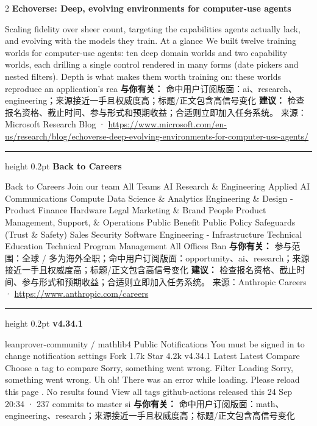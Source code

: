 \documentclass[10.5pt]{ctexart}
\begin{document}
\begin{multicols}{2}
{\large\bfseries Echoverse: Deep, evolving environments for computer-use agents}\par
Scaling fidelity over sheer count, targeting the capabilities agents actually lack, and evolving with the models they train. At a glance We built twelve training worlds for computer-use agents: ten deep domain worlds and two capability worlds, each drilling a single control rendered in many forms (date pickers and nested filters). Depth is what makes them worth training on: these worlds reproduce an application’s rea
\textbf{与你有关：} 命中用户订阅版面：ai、research、engineering；来源接近一手且权威度高；标题/正文包含高信号变化
\textbf{建议：} 检查报名资格、截止时间、参与形式和预期收益；合适则立即加入任务系统。
{\footnotesize\color{ormuted} 来源：Microsoft Research Blog · \url{https://www.microsoft.com/en-us/research/blog/echoverse-deep-evolving-environments-for-computer-use-agents/}}
\vspace{2mm}
\hrule height 0.2pt
\vspace{2mm}
{\large\bfseries Back to Careers}\par
Back to Careers Join our team All Teams AI Research \& Engineering Applied AI Communications Compute Data Science \& Analytics Engineering \& Design - Product Finance Hardware Legal Marketing \& Brand People Product Management, Support, \& Operations Public Benefit Public Policy Safeguards (Trust \& Safety) Sales Security Software Engineering - Infrastructure Technical Education Technical Program Management All Offices Ban
\textbf{与你有关：} 参与范围：全球 / 多为海外全职；命中用户订阅版面：opportunity、ai、research；来源接近一手且权威度高；标题/正文包含高信号变化
\textbf{建议：} 检查报名资格、截止时间、参与形式和预期收益；合适则立即加入任务系统。
{\footnotesize\color{ormuted} 来源：Anthropic Careers · \url{https://www.anthropic.com/careers}}
\vspace{2mm}
\hrule height 0.2pt
\vspace{2mm}
{\large\bfseries v4.34.1}\par
leanprover-community / mathlib4 Public Notifications You must be signed in to change notification settings Fork 1.7k Star 4.2k v4.34.1 Latest Latest Compare Choose a tag to compare Sorry, something went wrong. Filter Loading Sorry, something went wrong. Uh oh! There was an error while loading. Please reload this page . No results found View all tags github-actions released this 24 Sep 20:34 · 237 commits to master si
\textbf{与你有关：} 命中用户订阅版面：math、engineering、research；来源接近一手且权威度高；标题/正文包含高信号变化

\end{multicols}
\end{document}
